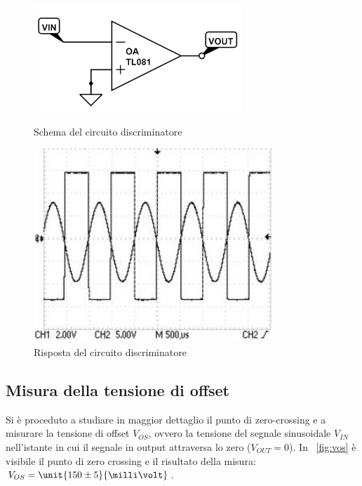 \documentclass[10pt,a4paper]{article}
\begin{document}
\begin{figure}[H]
	\begin{minipage}{0.49\textwidth}
		\centering
		\includegraphics[width=0.7\textwidth]{../circuiti/discriminatore.jpg}
		\caption{Schema del circuito discriminatore}
		\label{circuito_discriminatore}
	\end{minipage}
	\begin{minipage}{0.49\textwidth}
		\centering
		\includegraphics[width=0.8\textwidth]{../oscilloscopio/discriminator.jpg}
		\caption{Risposta del circuito discriminatore}
		\label{fig:discriminator}
	\end{minipage}
\end{figure}

\subsection{Misura della tensione di offset}
Si è proceduto a studiare in maggior dettaglio il punto di zero-crossing e a misurare la tensione di offset $V_{OS}$, ovvero la tensione del segnale sinusoidale $V_{IN}$ nell'istante in cui il segnale in output attraversa lo zero ($V_{OUT}=0$). In \figurename{~\ref{fig:vos}} è visibile il punto di zero crossing e il risultato della misura: $V_{OS} = \unit{150 \pm 5}{\milli\volt}$.
\end{document}
